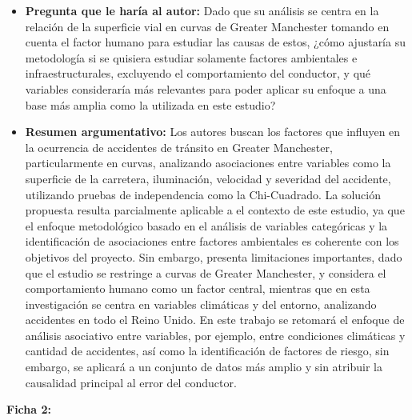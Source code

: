 \documentclass[12pt]{article}
\begin{document}
\begin{itemize}
	\item \textbf{Pregunta que le haría al autor:} Dado que su análisis se centra en la relación de la superficie vial en 
    curvas de Greater Manchester tomando en cuenta el factor humano para estudiar las causas de estos, ¿cómo ajustaría su 
    metodología si se quisiera estudiar solamente factores ambientales e infraestructurales, excluyendo el comportamiento 
    del conductor, y qué variables consideraría más relevantes para poder aplicar su enfoque a una base más amplia como la 
    utilizada en este estudio?
    
	\item \textbf{Resumen argumentativo:} Los autores buscan los factores que influyen en la ocurrencia de accidentes de 
    tránsito en Greater Manchester, particularmente en curvas, analizando asociaciones entre variables como la superficie 
    de la carretera, iluminación, velocidad y severidad del accidente, utilizando pruebas de independencia como la Chi-Cuadrado.
    La solución propuesta resulta parcialmente aplicable a el contexto de este estudio, ya que el enfoque metodológico basado en el
    análisis de variables categóricas y la identificación de asociaciones entre factores ambientales es coherente con los 
    objetivos del proyecto. Sin embargo, presenta limitaciones importantes, dado que el estudio se restringe a curvas 
    de Greater Manchester, y considera el comportamiento humano como un factor central, mientras que en esta investigación
    se centra en variables climáticas y del entorno, analizando accidentes en todo el Reino Unido. En este trabajo 
    se retomará el enfoque de análisis asociativo entre variables, por ejemplo, entre condiciones climáticas y cantidad 
    de accidentes, así como la identificación de factores de riesgo, sin embargo, se aplicará a un conjunto de datos 
    más amplio y sin atribuir la causalidad principal al error del conductor.\\
\end{itemize} 

\textbf{Ficha 2:}
\end{document}
